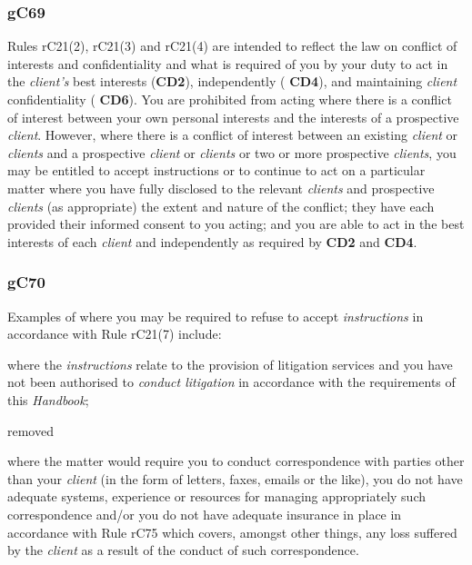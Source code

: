 

\subsubsection{\color{darkgrey}gC69}

Rules rC21(2), rC21(3) and rC21(4) are intended to reflect the law on
conflict of interests and confidentiality and what is required of you by
your duty to act in the \emph{client's} best interests (\textcolor{mygold}{\textbf{CD2}}),
independently ( \textbf{\textcolor{mygold}{CD4}}), and maintaining \emph{client} confidentiality
( \textbf{\textcolor{mygold}{CD6}}). You are prohibited from acting where there is a conflict of
interest between your own personal interests and the interests of a
prospective \emph{client}. However, where there is a conflict of
interest between an existing \emph{client} or \emph{clients} and a
prospective \emph{client} or \emph{clients} or two or more prospective
\emph{clients}, you may be entitled to accept instructions or to
continue to act on a particular matter where you have fully disclosed to
the relevant \emph{clients} and prospective \emph{clients} (as
appropriate) the extent and nature of the conflict; they have each
provided their informed consent to you acting; and you are able to act
in the best interests of each \emph{client} and independently as
required by \textbf{\textcolor{mygold}{CD2}} and  \textbf{\textcolor{mygold}{CD4}}.

\subsubsection{\color{darkgrey}gC70}

Examples of where you may be required to refuse to accept
\emph{instructions} in accordance with Rule rC21(7) include:
\begin{numlist}\item where the \emph{instructions} relate to the provision of litigation
services and you have not been authorised to \emph{conduct litigation}
in accordance with the requirements of this \emph{Handbook};
\item removed
\item where the matter would require you to conduct correspondence with
parties other than your \emph{client} (in the form of letters, faxes,
emails or the like), you do not have adequate systems, experience or
resources for managing appropriately such correspondence and/or you do
not have adequate insurance in place in accordance with Rule rC75 which
covers, amongst other things, any loss suffered by the \emph{client} as
a result of the conduct of such correspondence.
\end{numlist}

